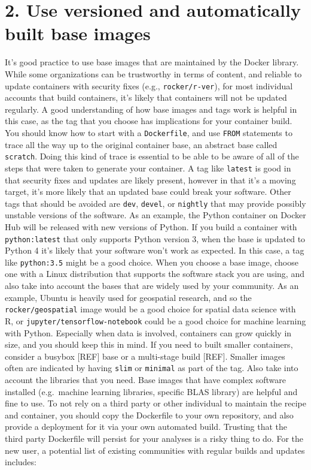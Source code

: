 \documentclass[10pt,letterpaper]{article}
\begin{document}
\hypertarget{use-versioned-and-automatically-built-base-images}{%
\section*{2. Use versioned and automatically built base
images}\label{use-versioned-and-automatically-built-base-images}}

It's good practice to use base images that are maintained by the Docker
library. While some organizations can be trustworthy in terms of
content, and reliable to update containers with security fixes (e.g.,
\texttt{rocker/r-ver}), for most individual accounts that build
containers, it's likely that containers will not be updated regularly. A
good understanding of how base images and tags work is helpful in this
case, as the tag that you choose has implications for your container
build. You should know how to start with a \texttt{Dockerfile}, and use
\texttt{FROM} statements to trace all the way up to the original
container base, an abstract base called \texttt{scratch}. Doing this
kind of trace is essential to be able to be aware of all of the steps
that were taken to generate your container. A tag like \texttt{latest}
is good in that security fixes and updates are likely present, however
in that it's a moving target, it's more likely that an updated base
could break your software. Other tags that should be avoided are
\texttt{dev}, \texttt{devel}, or \texttt{nightly} that may provide
possibly unstable versions of the software. As an example, the Python
container on Docker Hub will be released with new versions of Python. If
you build a container with \texttt{python:latest} that only supports
Python version 3, when the base is updated to Python 4 it's likely that
your software won't work as expected. In this case, a tag like
\texttt{python:3.5} might be a good choice. When you choose a base
image, choose one with a Linux distribution that supports the software
stack you are using, and also take into account the bases that are
widely used by your community. As an example, Ubuntu is heavily used for
geospatial research, and so the \texttt{rocker/geospatial} image would
be a good choice for spatial data science with R, or
\texttt{jupyter/tensorflow-notebook} could be a good choice for machine
learning with Python. Especially when data is involved, containers can
grow quickly in size, and you should keep this in mind. If you need to
built smaller containers, consider a busybox {[}REF{]} base or a
multi-stage build {[}REF{]}. Smaller images often are indicated by
having \texttt{slim} or \texttt{minimal} as part of the tag. Also take
into account the libraries that you need. Base images that have complex
software installed (e.g.~machine learning libraries, specific BLAS
library) are helpful and fine to use. To not rely on a third party or
other individual to maintain the recipe and container, you should copy
the Dockerfile to your own repository, and also provide a deployment for
it via your own automated build. Trusting that the third party
Dockerfile will persist for your analyses is a risky thing to do. For
the new user, a potential list of existing communities with regular
builds and updates includes:
\end{document}
